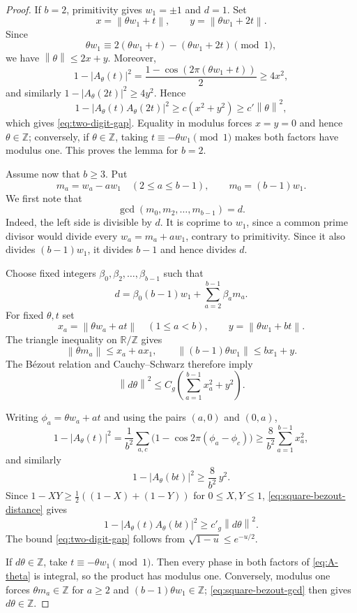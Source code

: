 \documentclass[11pt,reqno]{amsart}
\theoremstyle{plain}
\theoremstyle{definition}
\newcommand{\Z}{\mathbb{Z}}
\newcommand{\R}{\mathbb{R}}
\newcommand{\1}{\mathbf 1}
\newcommand{\norm}[1]{\left\lVert #1\right\rVert}
\begin{document}
\begin{proof}
If $b=2$, primitivity gives $w_1=\pm1$ and $d=1$.  Set
\[
 x=\norm{\theta w_1+t},\qquad y=\norm{\theta w_1+2t}.
\]
Since
\[
 \theta w_1\equiv2(\theta w_1+t)-(\theta w_1+2t)\pmod1,
\]
we have $\norm\theta\le2x+y$.  Moreover,
\[
 1-|A_\theta(t)|^2
 =\frac{1-\cos(2\pi(\theta w_1+t))}{2}\ge4x^2,
\]
and similarly $1-|A_\theta(2t)|^2\ge4y^2$.  Hence
\[
 1-|A_\theta(t)A_\theta(2t)|^2\ge c(x^2+y^2)\ge c'\norm\theta^2,
\]
which gives \eqref{eq:two-digit-gap}.  Equality in modulus forces $x=y=0$ and hence $\theta\in\Z$; conversely, if $\theta\in\Z$, taking $t\equiv-\theta w_1\pmod1$ makes both factors have modulus one.  This proves the lemma for $b=2$.

Assume now that $b\ge3$.  Put
\[
 m_a=w_a-aw_1\quad(2\le a\le b-1),\qquad m_0=(b-1)w_1.
\]
We first note that
\begin{equation}\label{eq:square-bezout-gcd}
 \gcd(m_0,m_2,\ldots,m_{b-1})=d.
\end{equation}
Indeed, the left side is divisible by $d$.  It is coprime to $w_1$, since a common prime divisor would divide every $w_a=m_a+aw_1$, contrary to primitivity.  Since it also divides $(b-1)w_1$, it divides $b-1$ and hence divides $d$.

Choose fixed integers $\beta_0,\beta_2,\ldots,\beta_{b-1}$ such that
\[
 d=\beta_0(b-1)w_1+\sum_{a=2}^{b-1}\beta_am_a.
\]
For fixed $\theta,t$ set
\[
 x_a=\norm{\theta w_a+at}\quad(1\le a<b),
 \qquad y=\norm{\theta w_1+bt}.
\]
The triangle inequality on $\R/\Z$ gives
\[
 \norm{\theta m_a}\le x_a+ax_1,
 \qquad
 \norm{(b-1)\theta w_1}\le bx_1+y.
\]
The B\'ezout relation and Cauchy--Schwarz therefore imply
\begin{equation}\label{eq:square-bezout-distance}
 \norm{d\theta}^2\le C_g\left(\sum_{a=1}^{b-1}x_a^2+y^2\right).
\end{equation}

Writing $\phi_a=\theta w_a+at$ and using the pairs $(a,0)$ and $(0,a)$,
\[
 1-|A_\theta(t)|^2
 =\frac1{b^2}\sum_{a,c}\bigl(1-\cos 2\pi(\phi_a-\phi_c)\bigr)
 \ge \frac8{b^2}\sum_{a=1}^{b-1}x_a^2,
\]
and similarly
\[
 1-|A_\theta(bt)|^2\ge \frac8{b^2}\,y^2.
\]
Since $1-XY\ge\frac12((1-X)+(1-Y))$ for $0\le X,Y\le1$, \eqref{eq:square-bezout-distance} gives
\[
 1-|A_\theta(t)A_\theta(bt)|^2\ge c'_g\norm{d\theta}^2.
\]
The bound \eqref{eq:two-digit-gap} follows from $\sqrt{1-u}\le e^{-u/2}$.

If $d\theta\in\Z$, take $t\equiv-\theta w_1\pmod1$.  Then every phase in both factors of \eqref{eq:A-theta} is integral, so the product has modulus one.  Conversely, modulus one forces $\theta m_a\in\Z$ for $a\ge2$ and $(b-1)\theta w_1\in\Z$; \eqref{eq:square-bezout-gcd} then gives $d\theta\in\Z$.
\end{proof}
\end{document}

